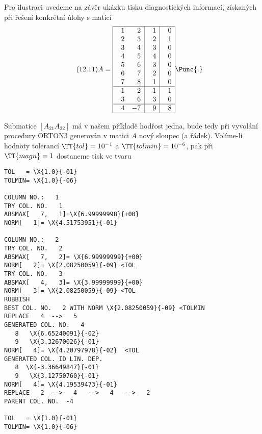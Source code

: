 {{Pro ilustraci uvedeme na závěr ukázku tisku diagnostických
informací, získaných při řešení konkrétní úlohy s maticí
%
\begin{align*}
\tag{12.11}
A =
\begin{array}{|rr|r|r|}
\hline
 ~~1 &  ~~2 &  ~~1 &  ~~0 \\
 2 &  3 &  2 &  1 \\
 3 &  4 &  3 &  0 \\
 4 &  5 &  4 &  0 \\
 5 &  6 &  3 &  0 \\
 6 &  7 &  2 &  0 \\
 7 &  8 &  1 &  0 \\
 \hline
 1 &  2 &  1 &  1 \\
 3 &  6 &  3 &  0 \\
 \hline
 4 & -7 &  9 &  8 \\
 \hline
\end{array}\Punc{.}
\end{align*}

\noindent
Submatice $[A_{21} A_{22}]$ má v našem příkladě hodřost jedna, bude
tedy při vyvolání procedury ORTON3 generován v matici $A$ nový sloupec
(a řádek). Volíme-li hodnoty tolerancí $\TT{tol} = 10^{-1}$ a
$\TT{tolmin} = 10^{-6}$, pak při $\TT{magn}=1$ dostaneme tisk ve tvaru

\newcommand{\X}[2]{#1${}_{\texttt{10}}$#2\!\!}%
\newpage
{\small%
\begin{Verbatim}[commandchars=\\\{\},codes={\catcode`$=3\catcode`_=8}]
TOL   = \X{1.0}{-01}
TOLMIN= \X{1.0}{-06}

COLUMN NO.:   1
TRY COL. NO.   1
ABSMAX[   7,   1]=\X{6.99999998}{+00}
NORM[   1]= \X{4.51753951}{-01}

COLUMN NO.:   2
TRY COL. NO.   2
ABSMAX[   7,   2]= \X{6.99999999}{+00}
NORM[   2]= \X{2.08250059}{-09} <TOL
TRY COL. NO.   3
ABSMAX[   4,   3]= \X{3.99999999}{+00}
NORM[   3]= \X{2.08250059}{-09} <TOL
RUBBISH
BEST COL. NO.   2 WITH NORM \X{2.08250059}{-09} <TOLMIN
REPLACE   4  -->   5
GENERATED COL. NO.   4
   8   \X{6.65240091}{-02}
   9   \X{3.32670026}{-01}
NORM[   4]= \X{4.20797978}{-02}  <TOL
GENERATED COL. ID LIN. DEP.
   8  \X{-3.36649847}{-01}
   9   \X{3.12750760}{-01}
NORM[   4]= \X{4.19539473}{-01}
REPLACE   2  -->   4   -->   4   -->   2
PARENT COL. NO.  -4

TOL   = \X{1.0}{-01}
TOLMIN= \X{1.0}{-06}


\end{Verbatim}}}}
